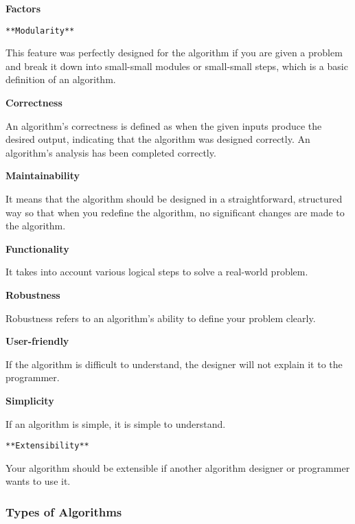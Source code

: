 \documentclass[
  letterpaper,
  DIV=11,
  numbers=noendperiod]{scrreprt}
\begin{document}
\begin{tcolorbox}[enhanced jigsaw, colframe=quarto-callout-note-color-frame, toprule=.15mm, bottomrule=.15mm, rightrule=.15mm, colback=white, breakable, arc=.35mm, opacityback=0, left=2mm, leftrule=.75mm]

\vspace{-3mm}\textbf{Factors}\vspace{3mm}

\texttt{**Modularity**}

This feature was perfectly designed for the algorithm if you are given a
problem and break it down into small-small modules or small-small steps,
which is a basic definition of an algorithm.

\textbf{Correctness}

An algorithm's correctness is defined as when the given inputs produce
the desired output, indicating that the algorithm was designed
correctly. An algorithm's analysis has been completed correctly.

\textbf{Maintainability}

It means that the algorithm should be designed in a straightforward,
structured way so that when you redefine the algorithm, no significant
changes are made to the algorithm.

\textbf{Functionality}

It takes into account various logical steps to solve a real-world
problem.

\textbf{Robustness}

Robustness refers to an algorithm's ability to define your problem
clearly.

\textbf{User-friendly}

If the algorithm is difficult to understand, the designer will not
explain it to the programmer.

\textbf{Simplicity}

If an algorithm is simple, it is simple to understand.

\texttt{**Extensibility**}

Your algorithm should be extensible if another algorithm designer or
programmer wants to use it.

\end{tcolorbox}

\subsubsection*{Types of Algorithms}\label{types-of-algorithms}
\end{document}
